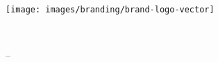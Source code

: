 \vspace{-0.5cm}
\texttt{[image: images/branding/brand-logo-vector]}

\vspace{8.5cm}
\begin{minipage}{\textwidth}
    \sffamily

    \vspace{2mm}
    {\YUGE \raggedleft\bookletunittitle\\}

    \vspace{1mm}
    {\huge \raggedleft\coursetitle { }-- \formattedunittitle\\}

    \vspace{2mm}
    {\small \raggedleft\bookletsubtitle\\}
\end{minipage}
\vfill